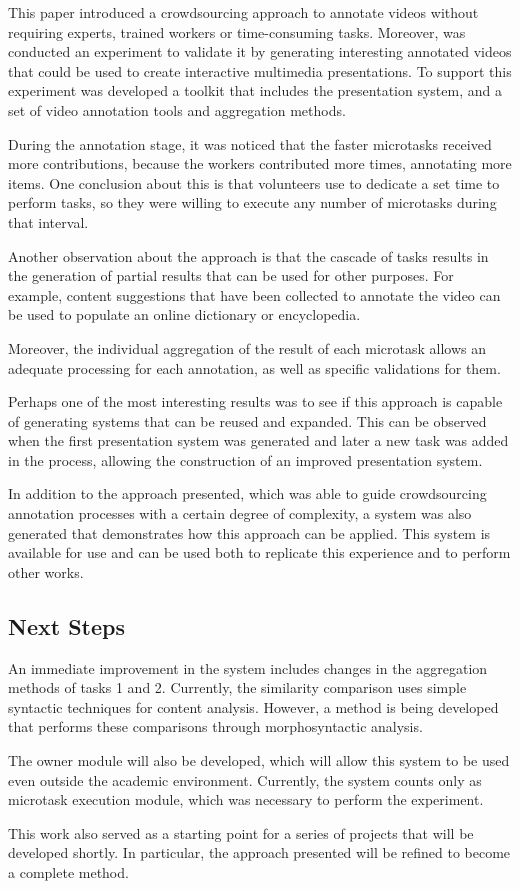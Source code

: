 This paper introduced a crowdsourcing approach to annotate videos without requiring experts, trained workers or time-consuming tasks. Moreover, was conducted an experiment to validate it by generating interesting annotated videos that could be used to create interactive multimedia presentations. To support this experiment was developed a toolkit that includes the presentation system, and a set of video annotation tools and aggregation methods.

During the annotation stage, it was noticed that the faster microtasks received more contributions, because the workers contributed more times, annotating more items. One conclusion about this is that volunteers use to dedicate a set time to perform tasks, so they were willing to execute any number of microtasks during that interval.

Another observation about the approach is that the cascade of tasks results in the generation of partial results that can be used for other purposes. For example, content suggestions that have been collected to annotate the video can be used to populate an online dictionary or encyclopedia.

Moreover, the individual aggregation of the result of each microtask allows an adequate processing for each annotation, as well as specific validations for them.

Perhaps one of the most interesting results was to see if this approach is capable of generating systems that can be reused and expanded. This can be observed when the first presentation system was generated and later a new task was added in the process, allowing the construction of an improved presentation system.

In addition to the approach presented, which was able to guide crowdsourcing annotation processes with a certain degree of complexity, a system was also generated that demonstrates how this approach can be applied. This system is available for use and can be used both to replicate this experience and to perform other works.



\subsection{Next Steps}

An immediate improvement in the system includes changes in the aggregation methods of tasks 1 and 2. Currently, the similarity comparison uses simple syntactic techniques for content analysis. However, a method is being developed that performs these comparisons through morphosyntactic analysis.

The owner module will also be developed, which will allow this system to be used even outside the academic environment. Currently, the system counts only as microtask execution module, which was necessary to perform the experiment.

This work also served as a starting point for a series of projects that will be developed shortly. In particular, the approach presented will be refined to become a complete method.
